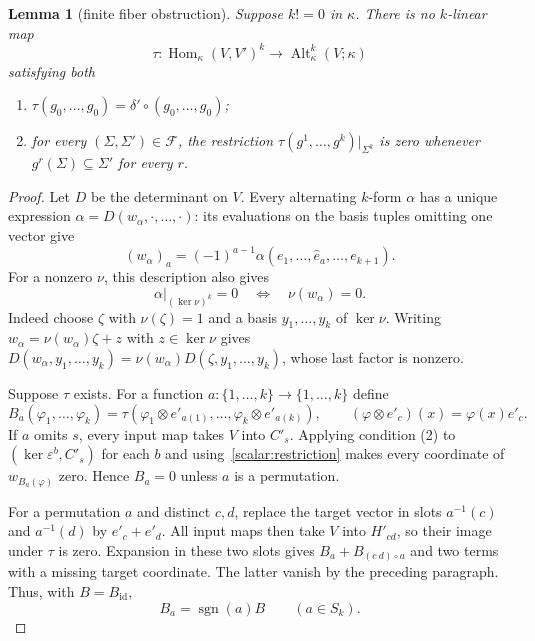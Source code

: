 \documentclass[11pt]{amsart}
\newtheorem{lemma}[theorem]{Lemma}
\theoremstyle{definition}
\theoremstyle{remark}
\numberwithin{equation}{section}
\newcommand{\Alt}{\operatorname{Alt}}
\newcommand{\sgn}{\operatorname{sgn}}
\newcommand{\id}{\mathrm{id}}
\begin{document}
\begin{lemma}[finite fiber obstruction]\label{scalar:fibre}
Suppose $k! = 0$ in $\kappa$. There is no $k$\nobreakdash-linear map
\[
 \tau\colon\operatorname{Hom}_\kappa(V,V')^k\longrightarrow\Alt^k_\kappa(V;\kappa)
\]
satisfying both
\begin{enumerate}
\item $\tau(g_0,\dots,g_0)=\delta'\circ(g_0,\dots,g_0)$;
\item for every $(\Sigma,\Sigma')\in\mathcal F$, the restriction
$\tau(g^1,\dots,g^k)|_{\Sigma^k}$ is zero whenever $g^r(\Sigma)\subseteq\Sigma'$ for every $r$.
\end{enumerate}
\end{lemma}

\begin{proof}
Let $D$ be the determinant on $V$. Every alternating $k$\nobreakdash-form $\alpha$ has a unique expression
$\alpha=D(w_\alpha,\cdot,\dots,\cdot)$: its evaluations on the basis tuples omitting one vector give
\[
 (w_\alpha)_a=(-1)^{a-1}\alpha(e_1,\dots,\widehat e_a,\dots,e_{k+1}).
\]
For a nonzero $\nu$, this description also gives
\begin{equation}\label{scalar:restriction}
 \alpha|_{(\ker\nu)^k}=0\quad\Longleftrightarrow\quad\nu(w_\alpha)=0.
\end{equation}
Indeed choose $\zeta$ with $\nu(\zeta)=1$ and a basis $y_1,\dots,y_k$ of $\ker\nu$. Writing
$w_\alpha=\nu(w_\alpha)\zeta+z$ with $z\in\ker\nu$ gives
$D(w_\alpha,y_1,\dots,y_k)=\nu(w_\alpha)D(\zeta,y_1,\dots,y_k)$, whose last factor is nonzero.

Suppose $\tau$ exists. For a function $a\colon\{1,\dots,k\}\to\{1,\dots,k\}$ define
\[
 B_a(\varphi_1,\dots,\varphi_k)
 =\tau(\varphi_1\otimes e'_{a(1)},\dots,\varphi_k\otimes e'_{a(k)}),
 \qquad (\varphi\otimes e'_c)(x)=\varphi(x)e'_c.
\]
If $a$ omits $s$, every input map takes $V$ into $C'_s$. Applying condition (2) to
$(\ker\varepsilon^b,C'_s)$ for each $b$ and using~\eqref{scalar:restriction} makes every coordinate of
$w_{B_a(\varphi)}$ zero. Hence $B_a=0$ unless $a$ is a permutation.

For a permutation $a$ and distinct $c,d$, replace the target vector in slots $a^{-1}(c)$ and $a^{-1}(d)$
by $e'_c+e'_d$. All input maps then take $V$ into $H'_{cd}$, so their image under $\tau$ is zero.
Expansion in these two slots gives $B_a+B_{(c\ d)\circ a}$ and two terms with a missing target coordinate.
The latter vanish by the preceding paragraph. Thus, with $B=B_{\id}$,
\begin{equation}\label{scalar:target-sign}
 B_a=\sgn(a)B\qquad(a\in S_k).
\end{equation}


\end{proof}
\end{document}
